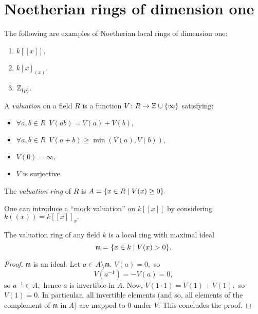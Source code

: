 \section{Noetherian rings of dimension one}

\begin{example}
  The following are examples of Noetherian local rings of dimension one:
  \begin{enumerate}
  \item \(k[[x]]\),
  \item \(k[x]_{(x)}\),
  \item \(\mathbb Z_{(p)}\).
  \end{enumerate}
\end{example}

\begin{df}
  A \emph{valuation} on a field \(R\) is a function \(V \colon R \to \mathbb Z \cup \{\infty\}\) satisfying:
  \begin{itemize}
  \item \(\forall a, b \in R \enspace V(ab) = V(a) + V(b),\)
  \item \(\forall a, b \in R \enspace V(a + b) \geq \min(V(a), V(b)),\)
  \item \(V(0) = \infty,\)
  \item \(V\) is surjective.
  \end{itemize}
  The \emph{valuation ring} of \(R\) is
  \(A = \{x \in R \mathrel{|} V(x) \geq 0\}.\)
\end{df}

\begin{example}
  One can introduce a ``mock valuation'' on \(k[[x]]\) by considering \(k((x)) = k[[x]]_x.\)
\end{example}

\begin{prop}
  The valuation ring of any field \(k\) is a local ring with maximal ideal
  \[\mathfrak m = \{x \in k \mathrel{|} V(x) > 0\}.\]
\end{prop}
\begin{proof}
  \(\mathfrak m\) is an ideal.
  Let \(a \in A \setminus \mathfrak m.\) \(V(a) = 0,\) so
  \[V(a^{-1}) = -V(a) = 0,\]
  so \(a^{-1} \in A,\) hence \(a\) is invertible in \(A.\)
  Now,
  \(V(1 \cdot 1) = V(1) + V(1),\)
  so \(V(1) = 0.\)
  In particular, all invertible elements (and so, all elements of the complement of \(\mathfrak m\) in \(A\)) are mapped to \(0\) under \(V.\) This concludes the proof.
\end{proof}

